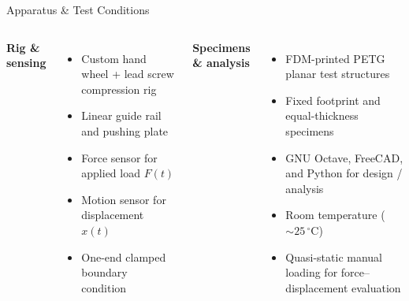 \begin{frame}{Apparatus \& Test Conditions}
  \small
  \begin{columns}[T,onlytextwidth]
    \textbf{Rig \& sensing}
    \begin{itemize}\setlength\itemsep{3pt}
      \item Custom hand wheel + lead screw compression rig
      \item Linear guide rail and pushing plate
      \item Force sensor for applied load $F(t)$
      \item Motion sensor for displacement $x(t)$
      \item One-end clamped boundary condition
    \end{itemize}

    \textbf{Specimens \& analysis}
    \begin{itemize}\setlength\itemsep{3pt}
      \item FDM-printed PETG planar test structures
      \item Fixed footprint and equal-thickness specimens
      \item GNU Octave, FreeCAD, and Python for design / analysis
      \item Room temperature ($\sim\!25\,{}^{\circ}\mathrm{C}$)
      \item Quasi-static manual loading for force--displacement evaluation
    \end{itemize}
  \end{columns}
\end{frame}

